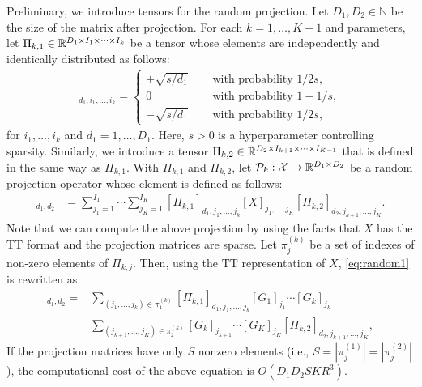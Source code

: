 Preliminary, we introduce tensors for the random projection. Let
$D_1,D_2 \in \mathbb{N}$ be the size of the matrix after projection.
For each $k = 1,\ldots,K-1$ and parameters, let
$\Pi_{k,1} \in \mathbb{R}^{D_1 \times I_1 \times \cdots \times I_{k}}$ be a
tensor whose elements are independently and identically distributed as follows:
\begin{align}
    [\Pi_{k,1}]_{d_1,i_1, \ldots,i_k} = 
    \begin{cases}
        +\sqrt{s/d_1} \quad & \mbox{~with probability~}1/2s,\\
        0 \quad & \mbox{~with probability~}1-1/s,\\
        -\sqrt{s/d_1} \quad & \mbox{~with probability~}1/2s,        \label{def:pi}
    \end{cases}
\end{align}
for $i_1,\ldots,i_k$ and $d_1 = 1,\ldots,D_1$.
Here, $s>0$ is a hyperparameter controlling sparsity.
Similarly, we introduce a tensor
$\Pi_{k,2} \in \mathbb{R}^{D_2 \times I_{k+1} \times \cdots \times I_{K-1}}$ that is defined in the same way as $\Pi_{k,1}$.
%
With $\Pi_{k,1}$ and $\Pi_{k,2}$, let
$\mathcal{P}_k : \mathcal{X} \to \mathbb{R}^{D_1 \times D_2}$ be a random projection operator
whose element is defined as follows:
\begin{align}
    [\mP_k(X)]_{d_1,d_2} 
  &= \sum_{j_1=1}^{I_1}  \cdots \sum_{j_{K}=1}^{I_{K}} [\Pi_{k,1}]_{d_1,j_1,\ldots,j_{k}}  [X]_{j_1,\ldots,j_K}[\Pi_{k,2}]_{d_2,j_{k+1},\ldots,j_{K}}. \label{eq:random1} 
\end{align}
Note that we can compute the above projection by using the facts that
$X$ has the TT format and the projection matrices are sparse.  Let
$\pi^{(k)}_{j}$ be a set of indexes of non-zero elements of
$\Pi_{k,j}$. Then, using the TT representation of $X$,
\eqref{eq:random1} is rewritten as
\begin{align*}
  [\mP_k(X(\mG))]_{d_1,d_2}  
  =& \sum_{(j_1, \ldots, j_k) \in \pi^{(k)}_{1}} [\Pi_{k,1}]_{d_1,j_1,\ldots,j_{k}} [G_1]_{j_1}  \cdots [G_k]_{j_k}
\\
  &\sum_{(j_{k+1}, \ldots, j_K) \in \pi^{(k)}_{2}} [G_k]_{j_{k+1}} \cdots [G_K]_{j_K} [\Pi_{k,2}]_{d_2,j_{k+1},\ldots,j_{K}},
\end{align*}
If the projection matrices have only $S$ nonzero elements (i.e.,
$S = |\pi^{(1)}_j|= |\pi^{(2)}_j|$), the computational cost of the
above equation is $O(D_1D_2SKR^3)$.


